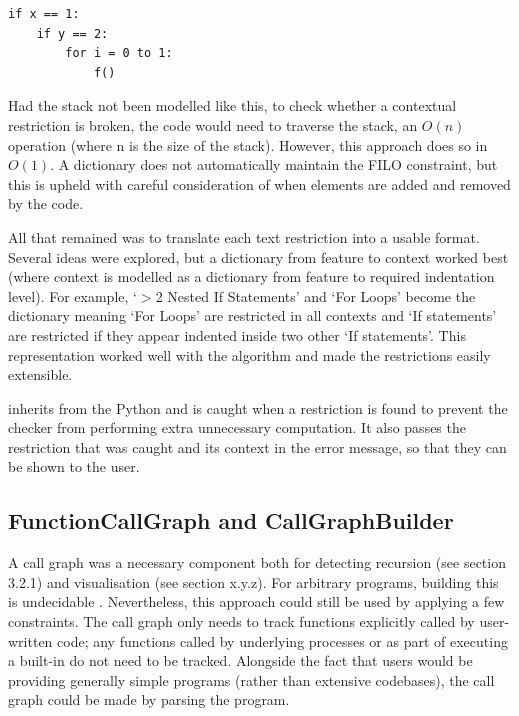 {\centering
\begin{minipage}[t]{0.48\textwidth}
    \begin{lstlisting}
if x == 1:
    if y == 2:
        for i = 0 to 1:
            f()
    \end{lstlisting}
\end{minipage}
\par}

Had the stack not been modelled like this, to check whether a contextual restriction is broken, the code would need to traverse the stack, an $O(n)$ operation (where n is the size of the stack). However, this approach does so in $O(1)$. A dictionary does not automatically maintain the FILO constraint, but this is upheld with careful consideration of when elements are added and removed by the code.

All that remained was to translate each text restriction into a usable format. Several ideas were explored, but a dictionary from feature to context worked best (where context is modelled as a dictionary from feature to required indentation level). For example, `$>$2 Nested If Statements' and `For Loops' become the dictionary  meaning `For Loops' are restricted in all contexts and `If statements' are restricted if they appear indented inside two other `If statements'. This representation worked well with the algorithm and made the restrictions easily extensible.

 inherits from the Python  and is caught when a restriction is found to prevent the checker from performing extra unnecessary computation. It also passes the restriction that was caught and its context in the error message, so that they can be shown to the user.

\subsection{FunctionCallGraph and CallGraphBuilder}

A call graph was a necessary component both for detecting recursion (see section 3.2.1) and visualisation (see section x.y.z). For arbitrary programs, building this is undecidable \cite{murphy_empirical_1998}. Nevertheless, this approach could still be used by applying a few constraints. The call graph only needs to track functions explicitly called by user-written code; any functions called by underlying processes or as part of executing a built-in do not need to be tracked. Alongside the fact that users would be providing generally simple programs (rather than extensive codebases), the call graph could be made by parsing the program.

